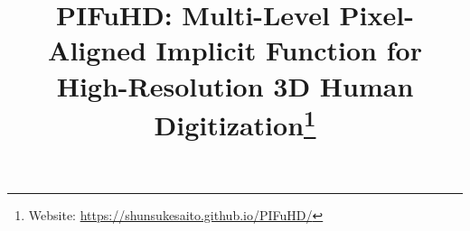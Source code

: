 \graphicspath{
{figures}
{images}
}



\title{PIFuHD: Multi-Level Pixel-Aligned Implicit Function for\\ High-Resolution 3D Human Digitization\thanks{Website: \url{https://shunsukesaito.github.io/PIFuHD/}}}


\maketitle
\thispagestyle{empty}


{\small
	
	
}


